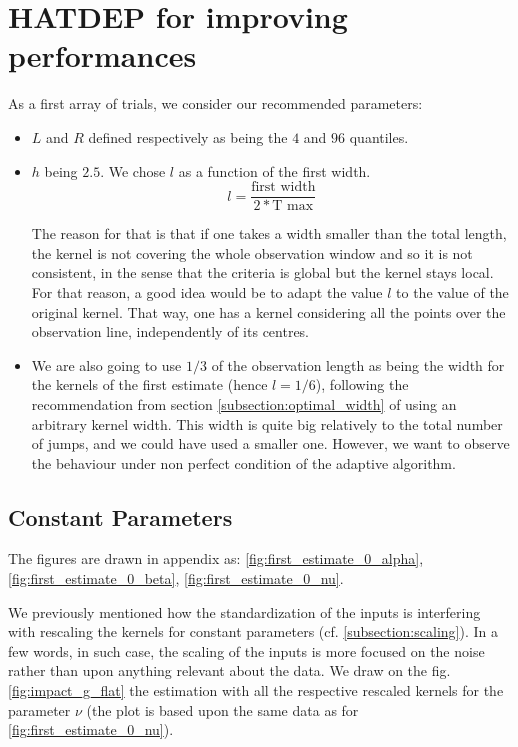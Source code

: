 \section{HATDEP for improving performances}
\label{section_first_simul}
As a first array of trials, we consider our recommended parameters: 
\begin{itemize}
\item $L$ and $R$ defined respectively as being the $4$ and $96$ quantiles.
\item $h$ being $2.5$. We chose $l$ as a function of the first width. 
$$l = \frac{ \text{first width} }{2* \text{T max} }$$

The reason for that is that if one takes a width smaller than the total length, the kernel is not covering the whole observation window and so it is not consistent, in the sense that the criteria is global but the kernel stays local. For that reason, a good idea would be to adapt the value $l$ to the value of the original kernel. That way, one has a kernel considering all the points over the observation line, independently of its centres.
\item We are also going to use $1/3$ of the observation length as being the width for the kernels of the first estimate (hence $l = 1/6$), following the recommendation from section \ref{subsection:optimal_width} of using an arbitrary kernel width. This width is quite big relatively to the total number of jumps, and we could have used a smaller one. However, we want to observe the behaviour under non perfect condition of the adaptive algorithm.
\end{itemize}




\subsection{Constant Parameters}
The figures are drawn in appendix as: \ref{fig:first_estimate_0_alpha}, \ref{fig:first_estimate_0_beta}, \ref{fig:first_estimate_0_nu}. 


We previously mentioned how the standardization of the inputs is interfering with rescaling the kernels for constant parameters (cf. \ref{subsection:scaling}). In a few words, in such case, the scaling of the inputs is more focused on the noise rather than upon anything relevant about the data. We draw on the fig. \ref{fig:impact_g_flat} the estimation with all the respective rescaled kernels for the parameter $\nu$ (the plot is based upon the same data as for \ref{fig:first_estimate_0_nu}). 

